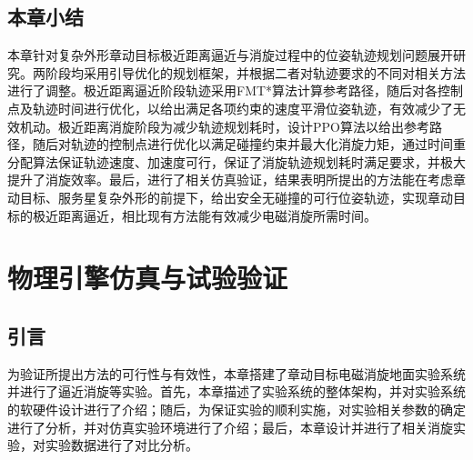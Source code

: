 \documentclass[lang=chs, degree=master, blindreview=false, winfonts=true]{yanputhesis}
\begin{document}
\section{本章小结}
本章针对复杂外形章动目标极近距离逼近与消旋过程中的位姿轨迹规划问题展开研究。两阶段均采用引导优化的规划框架，并根据二者对轨迹要求的不同对相关方法进行了调整。极近距离逼近阶段轨迹采用FMT*算法计算参考路径，随后对各控制点及轨迹时间进行优化，以给出满足各项约束的速度平滑位姿轨迹，有效减少了无效机动。极近距离消旋阶段为减少轨迹规划耗时，设计PPO算法以给出参考路径，随后对轨迹的控制点进行优化以满足碰撞约束并最大化消旋力矩，通过时间重分配算法保证轨迹速度、加速度可行，保证了消旋轨迹规划耗时满足要求，并极大提升了消旋效率。最后，进行了相关仿真验证，结果表明所提出的方法能在考虑章动目标、服务星复杂外形的前提下，给出安全无碰撞的可行位姿轨迹，实现章动目标的极近距离逼近，相比现有方法能有效减少电磁消旋所需时间。


\cleardoublepage

\chapter{物理引擎仿真与试验验证}
\section{引言}

为验证所提出方法的可行性与有效性，本章搭建了章动目标电磁消旋地面实验系统并进行了逼近消旋等实验。首先，本章描述了实验系统的整体架构，并对实验系统的软硬件设计进行了介绍；随后，为保证实验的顺利实施，对实验相关参数的确定进行了分析，并对仿真实验环境进行了介绍；最后，本章设计并进行了相关消旋实验，对实验数据进行了对比分析。
\end{document}
